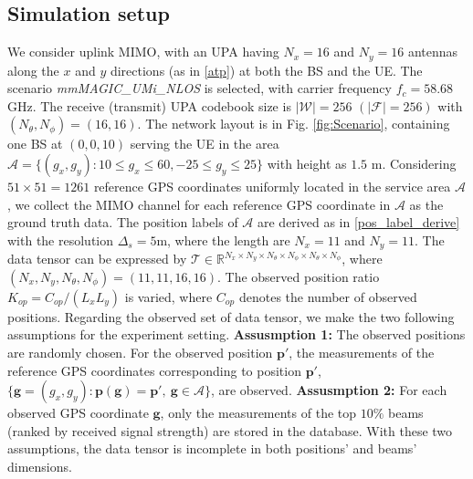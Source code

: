 \documentclass[12pt, draftcls, onecolumn]{IEEEtran}
\theoremstyle{plain}
\theoremstyle{definition}
\theoremstyle{remark}
\begin{document}
\subsection{Simulation setup}
We consider uplink MIMO, with an UPA having $N_x=16$ and $N_y=16$ antennas along the $x$ and $y$ directions (as in \eqref{atp}) at both the BS and the UE.
The scenario \textit{mmMAGIC\_UMi\_NLOS} is selected, with carrier frequency $f_c=58.68$ GHz.
The receive (transmit) UPA codebook size is $\vert\mathcal{W}\vert=256$ $\left(\vert\mathcal{F}\vert=256\right)$ with $(N_\theta,N_\phi)=(16,16)$.
The network layout is in Fig. \ref{fig:Scenario}, containing one BS at $(0,0,10)$ serving the UE in the area $\mathcal A=\{(g_x,g_y):10 \leq g_x\leq 60 ,-25 \leq g_y\leq 25 \}$ with height as $1.5$ m.
Considering $51\times 51=1261$ reference GPS coordinates uniformly located in the service area $\mathcal A$, we collect the MIMO channel for each reference GPS coordinate in $\mathcal A$ as the ground truth data.
The position labels of $\mathcal A$ are derived as in \eqref{pos_label_derive} with the resolution $\Delta_s = 5$m, where the length are $N_x=11$ and $N_y=11$.
The data tensor can be expressed by $\mathcal{T}\in \mathbb{R}^{N_x \times N_y \times N_\theta \times N_\phi \times N_\theta \times N_\phi}$, where $(N_x,N_y,N_\theta,N_\phi)=(11,11,16,16)$.
The observed position ratio $K_{op}=C_{op}/(L_xL_y)$ is varied, where $C_{op}$ denotes the number of observed positions.
Regarding the observed set of data tensor, we make the two following assumptions for the experiment setting.
\textbf{Assusmption 1:} The observed positions are randomly chosen. For the observed position $\mathbf p'$, the measurements of the reference GPS coordinates corresponding to position $\mathbf p'$, $\{\mathbf g =(g_x,g_y): \mathbf{p}(\mathbf{g})=\mathbf{p}',\ \mathbf{g}\in \mathcal A\}$, are observed.
\textbf{Assusmption 2:} For each observed GPS coordinate $\mathbf{g}$, only the measurements of the top $10\%$ beams (ranked by received signal strength) are stored in the database. 
With these two assumptions, the data tensor is incomplete in both positions' and beams' dimensions.
\end{document}
